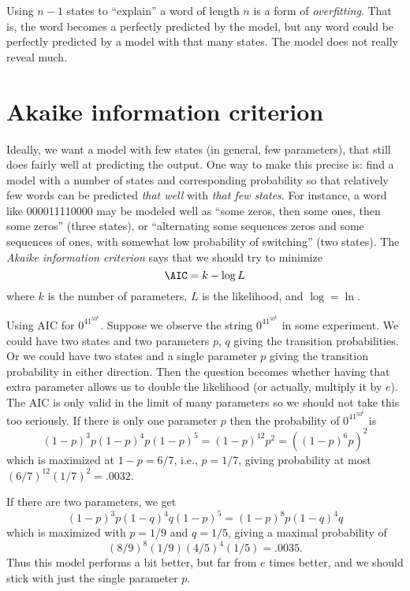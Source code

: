 		Using $n-1$ states to ``explain'' a word of length $n$ is a form of \emph{overfitting}.
		That is, the word becomes a perfectly predicted by the model, but any word could be perfectly predicted by a model with that many states. The model does not really reveal much.
	\section{Akaike information criterion}
		Ideally, we want a model with few states (in general, few parameters), that still does fairly well at predicting the output. One way to make this precise is: find a model with a number of states and corresponding probability so that relatively few words can be predicted \emph{that well} with \emph{that few states}. For instance, a word like 000011110000 may be modeled well as ``some zeros, then some ones, then some zeros'' (three states), or ``alternating some sequences zeros and some sequences of ones, with somewhat low probability of switching'' (two states). The \emph{Akaike information criterion} says that we should try to minimize
		\[
			\AIC = k-\log L
		\]
		where $k$ is the number of parameters, $L$ is the likelihood, and $\log=\ln$.
		\begin{example}{Using AIC for $0^41^50^6$.}
		Suppose we observe the string $0^41^50^6$ in some experiment.
		We could have two states and two parameters $p$, $q$ giving the transition probabilities.
		Or we could have two states and a single parameter $p$ giving the transition probability in either direction. Then the question becomes whether having that extra parameter allows us to double the likelihood (or actually, multiply it by $e$). The AIC is only valid in the limit of many parameters so we should not take this too seriously.
		If there is only one parameter $p$ then the probability of $0^41^50^6$ is
		\[
			(1-p)^3 p (1-p)^4 p (1-p)^5 = (1-p)^{12} p^2 = ((1-p)^6 p)^2
		\]
		which is maximized at $1-p=6/7$, i.e., $p=1/7$, giving probability at most $(6/7)^{12}(1/7)^2=.0032$.
		
		If there are two parameters, we get
		\[
			(1-p)^3 p (1-q)^4 q (1-p)^5 = (1-p)^8 p (1-q)^4 q
		\]
		which is maximized with $p=1/9$ and $q=1/5$, giving a maximal probability of
		\[
			(8/9)^8(1/9)(4/5)^4 (1/5)=.0035.
		\]
		Thus this model performs a bit better, but far from $e$ times better, and we should stick with just the single parameter $p$.
		\end{example}
		
